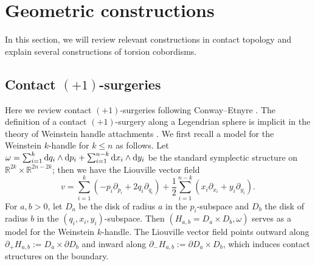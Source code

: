 \documentclass[11pt]{amsart}
\numberwithin{equation}{section}
\def\R{\mathbb{R}}
\def\rd{{\rm d}}
\begin{document}
\section{Geometric constructions}\label{s:geometric_construction}
In this section, we will review relevant constructions in contact topology and explain several constructions of torsion cobordisms. 


\subsection{Contact $(+1)$-surgeries}
Here we review contact $(+1)$-surgeries following Conway--Etnyre \cite{zbMATH07206659}. The definition of a contact $(+1)$-surgery along a Legendrian sphere is implicit in the theory of Weinstein handle attachments \cite{CieEli,zbMATH04147116,zbMATH00011093}. We first recall a model for the Weinstein $k$-handle for $k\le n$ as follows. Let $\omega = \sum_{i=1}^k\rd q_i\wedge \rd p_i + \sum_{i=1}^{n-k}\rd x_i\wedge \rd y_i$ be the standard symplectic structure on $\R^{2k}\times \R^{2n-2k}$; then we have the Liouville vector field 
$$v=\sum_{i=1}^k(-p_i\partial_{p_i}+2q_i\partial_{q_i})+\frac{1}{2}\sum_{i=1}^{n-k}(x_i\partial_{x_i}+y_i\partial_{y_i}).$$
For $a,b>0$, let $D_a$ be the disk of radius $a$ in the $p_i$-subspace and $D_b$ the disk of radius $b$ in the $(q_i,x_i,y_i)$-subspace. Then $(H_{a,b}=D_a\times D_b,\omega)$ serves as a model for the Weinstein $k$-handle. The Liouville vector field points outward along $\partial_+H_{a,b}:=D_a\times \partial D_b$ and inward along $\partial_-H_{a,b}:=\partial D_a \times D_b$, which induces contact structures on the boundary.
\end{document}
